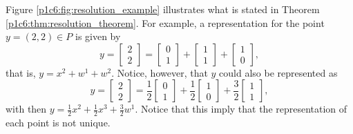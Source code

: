 Figure \ref{p1c6:fig:resolution_example} illustrates what is stated in Theorem \ref{p1c6:thm:resolution_theorem}. For example,  a representation for the point $y = (2,2) \in P$ is given by
%
\begin{equation*}
	y = \begin{bmatrix} 2 \\ 2
		\end{bmatrix}= \begin{bmatrix} 0 \\ 1
		\end{bmatrix} + \begin{bmatrix} 1 \\ 1
		\end{bmatrix} + \begin{bmatrix} 1 \\ 0
		\end{bmatrix}, 	
\end{equation*}
%
that is, $y = x^2 + w^1 + w^2$. Notice, however, that $y$ could also be represented as 
%
\begin{equation*}
	y = \begin{bmatrix} 2 \\ 2
		\end{bmatrix}= \frac{1}{2}\begin{bmatrix} 0 \\ 1
		\end{bmatrix} + \frac{1}{2}\begin{bmatrix} 1 \\ 0
		\end{bmatrix} + \frac{3}{2}\begin{bmatrix} 1 \\ 1
		\end{bmatrix}, 	
\end{equation*}
%
with then $y = \frac{1}{2}x^2 + \frac{1}{2}x^3 + \frac{3}{2}w^1$. Notice that this imply that the representation of each point is not unique.

